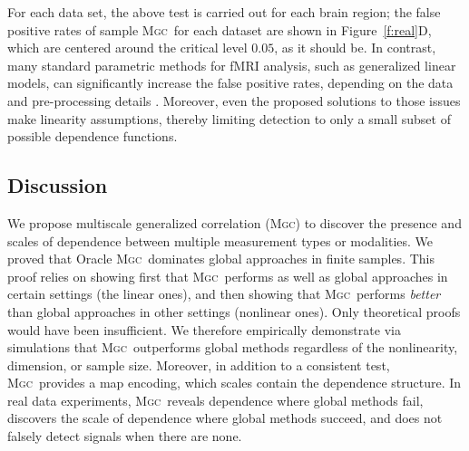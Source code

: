 \documentclass[11pt]{article}
\providecommand{\sct}[1]{{\normalfont\textsc{#1}}}
\newcommand{\Mgc}{\sct{Mgc}}
\begin{document}

For each data set, the above test is carried out for each brain region; the false positive rates of sample \Mgc~for each dataset are shown in Figure~\ref{f:real}{\color{magenta}D}, which are centered around the critical level $0.05$, as it should be.
In contrast, many standard parametric methods for fMRI analysis, such as generalized linear models, can significantly increase the false positive rates, depending on the data and pre-processing details \cite{EklundKnutsson2012,Eklund2015}. Moreover, even the proposed solutions to those issues make linearity assumptions, thereby limiting detection to only a small subset of possible dependence functions.

\subsection*{Discussion}
\label{conclu}

We propose multiscale generalized correlation (\Mgc) to discover the presence and scales of dependence between multiple measurement types or modalities.
We proved that Oracle \Mgc~dominates global approaches in finite samples.  This proof relies on showing first that \Mgc~performs as well as global approaches in certain settings (the linear ones), and then showing that \Mgc~performs \emph{better} than global approaches in other settings (nonlinear ones).  Only theoretical proofs would have been insufficient.  
We therefore empirically demonstrate via simulations that \Mgc~outperforms global methods regardless of the nonlinearity, dimension, or sample size.  Moreover, in addition to a consistent test, \Mgc~provides a map encoding, which scales contain the dependence structure. %
In real data experiments, \Mgc~reveals dependence where global methods fail, discovers the scale of dependence where global methods succeed, and does not falsely detect signals when there are none.
\end{document}
